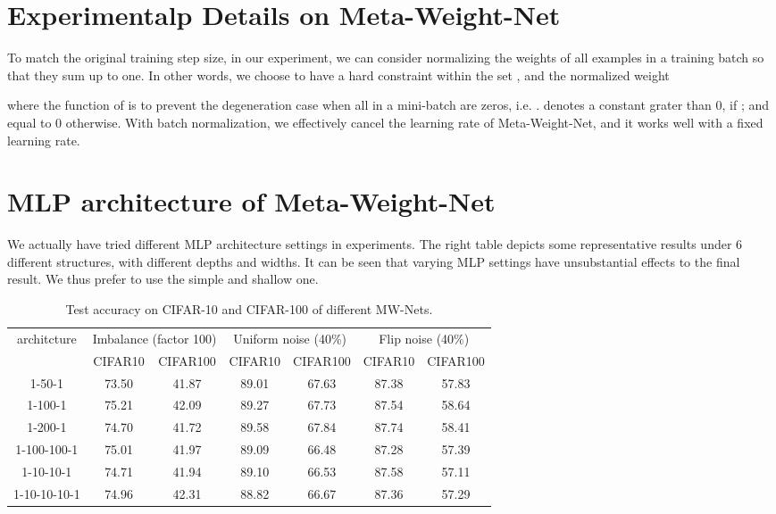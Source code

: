 \documentclass{article}
\begin{document}
	
	\section{Experimentalp Details on Meta-Weight-Net}
	To match the original training step size, in our experiment, we can consider normalizing the weights of all examples in a training batch so that they sum up to one. In other words, we choose to have a hard constraint within the set , and the normalized weight
	
	where the function of  is to prevent the degeneration case when all  in a mini-batch are zeros, i.e. .  denotes a constant grater than 0, if ; and equal to 0 otherwise. With batch normalization,
	we effectively cancel the learning rate of Meta-Weight-Net, and it works well with a fixed learning rate.
	
	\section{MLP architecture of Meta-Weight-Net}
	We actually have tried different MLP architecture settings in experiments. The right table depicts some representative results under 6 different structures, with different depths and widths. It can be seen that varying MLP settings have unsubstantial effects to the final result. We thus prefer to use the simple and shallow one.
	\begin{table}[htp]	\vspace{-4mm}
\caption{Test accuracy on CIFAR-10 and CIFAR-100 of different MW-Nets.}
\begin{tabular}{c|c|c|c|c|c|c}
			\toprule
			\multirow{2}{*}{architcture}  & \multicolumn{2}{c|}{Imbalance (factor 100)} & \multicolumn{2}{c|}{ Uniform noise (40\%)} & \multicolumn{2}{c}{ Flip noise (40\%)}\\
&  CIFAR10 &\multicolumn{1}{c|}{CIFAR100}& CIFAR10 &\multicolumn{1}{c|}{CIFAR100}& CIFAR10 &CIFAR100\\
\hline
			1-50-1 & 73.50 & 41.87 & 89.01  & 67.63  & 87.38  &57.83 \\
			\hline
			1-100-1 & 75.21 & 42.09 & 89.27  & 67.73  & 87.54  &58.64 \\
			\hline
			1-200-1 & 74.70 &41.72  &89.58   & 67.84  & 87.74  & 58.41\\
			\hline
			1-100-100-1 & 75.01 & 41.97 & 89.09  & 66.48  & 87.28  & 57.39\\
			\hline
			1-10-10-1 & 74.71 & 41.94 & 89.10  & 66.53  & 87.58  &57.11 \\
			\hline
			1-10-10-10-1 & 74.96 &42.31 &  88.82 & 66.67  & 87.36  &57.29 \\
			\bottomrule
		\end{tabular}
\end{table}
	
\end{document}
